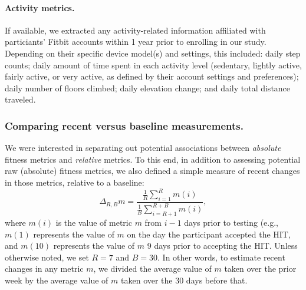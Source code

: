 \documentclass[10pt]{article}
\begin{document}
\paragraph{Activity metrics.}  If available, we extracted any
activity-related information affiliated with particiants' Fitbit
accounts within 1 year prior to enrolling in our study.  Depending on
their specific device model(s) and settings, this included: daily step
counts; daily amount of time spent in each activity level (sedentary,
lightly active, fairly active, or very active, as defined by their
account settings and preferences); daily number of floors climbed;
daily elevation change; and daily total distance traveled.



\subsubsection*{Comparing recent versus baseline measurements.}
We were interested in separating out potential associations between
\textit{absolute} fitness metrics and \textit{relative} metrics.  To
this end, in addition to assessing potential raw
(absolute) fitness metrics, we also defined a simple measure of recent
changes in those metrics, relative to a baseline:
\[
  \Delta_{R, B} m = \frac{\frac{1}{R} \sum_{i = 1}^R
  m(i)}{\frac{1}{B} \sum_{i=R + 1}^{R+B}m(i)},
\]
where $m(i)$ is the value of metric $m$ from $i - 1$ days prior to testing (e.g.,
$m(1)$ represents the value of $m$ on the day the participant accepted
the HIT, and $m(10)$ represents the value of $m$ 9 days prior to
accepting the HIT.  Unless otherwise noted, we set $R = 7$ and $B =
30$.  In other words, to estimate recent changes in any metric $m$, we
divided the average value of $m$ taken over the prior week by the
average value of $m$ taken over the 30 days before that.
\end{document}
